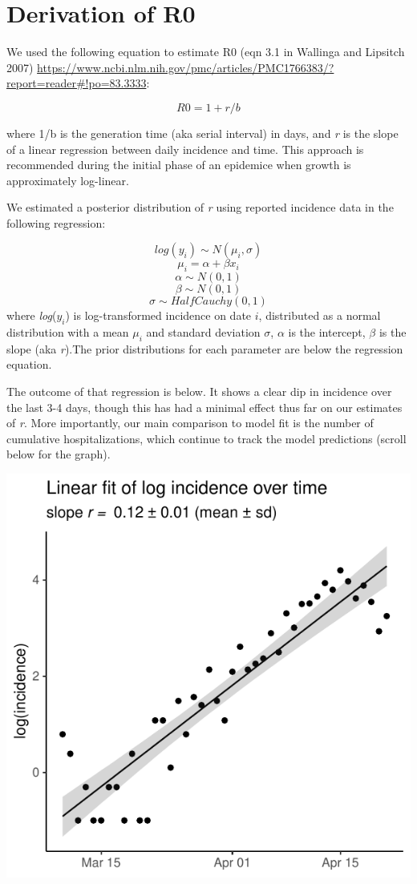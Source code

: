 \documentclass[
]{article}
\begin{document}
\hypertarget{derivation-of-r0}{%
\section{Derivation of R0}\label{derivation-of-r0}}

We used the following equation to estimate R0 (eqn 3.1 in Wallinga and
Lipsitch 2007)
\url{https://www.ncbi.nlm.nih.gov/pmc/articles/PMC1766383/?report=reader\#!po=83.3333}:

\[R0 = 1 + r/b\]

where 1/b is the generation time (aka serial interval) in days, and
\emph{r} is the slope of a linear regression between daily incidence and
time. This approach is recommended during the initial phase of an
epidemice when growth is approximately log-linear.

We estimated a posterior distribution of \emph{r} using reported
incidence data in the following regression:

\[log(y_i) \sim N(\mu_i, \sigma)\] \[\mu_i = \alpha + \beta x_i\]
\[\alpha \sim N(0,1)\] \[\beta \sim N(0,1)\]
\[\sigma \sim HalfCauchy(0,1)\] where \emph{log}(\(y_i\)) is
log-transformed incidence on date \(i\), distributed as a normal
distribution with a mean \(\mu_i\) and standard deviation \(\sigma\),
\(\alpha\) is the intercept, \(\beta\) is the slope (aka \emph{r}).The
prior distributions for each parameter are below the regression
equation.

The outcome of that regression is below. It shows a clear dip in
incidence over the last 3-4 days, though this has had a minimal effect
thus far on our estimates of \emph{r}. More importantly, our main
comparison to model fit is the number of cumulative hospitalizations,
which continue to track the model predictions (scroll below for the
graph).

\includegraphics{script_SIR_sims_publish_files/figure-latex/unnamed-chunk-4-1.pdf}
\end{document}
